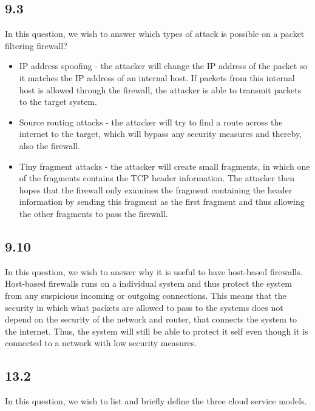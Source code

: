 \documentclass{article}
\begin{document}
\subsection{9.3}
In this question, we wish to answer which types of attack is possible on a packet filtering firewall?\\

\begin{itemize}
    \item IP address spoofing - the attacker will change the IP address of the packet so it matches the IP address of an internal host. If packets from this internal host is allowed through the firewall, the attacker is able to transmit packets to the target system. 
    
    \item Source routing attacks - the attacker will try to find a route across the internet to the target, which will bypass any security measures and thereby, also the firewall. 
    
    \item Tiny fragment attacks - the attacker will create small fragments, in which one of the fragments contains the TCP header information. The attacker then hopes that the firewall only examines the fragment containing the header information by sending this fragment as the first fragment and thus allowing the other fragments to pass the firewall. 
\end{itemize}


\subsection{9.10}
In this question, we wish to answer why it is useful to have host-based firewalls.\\

Host-based firewalls runs on a individual system and thus protect the system from any suspicious incoming or outgoing connections. This means that the security in which what packets are allowed to pass to the systems does not depend on the security of the network and router, that connects the system to the internet. Thus, the system will still be able to protect it self even though it is connected to a network with low security measures. 

\subsection{13.2}
In this question, we wish to list and briefly define the three cloud service models.
\end{document}
